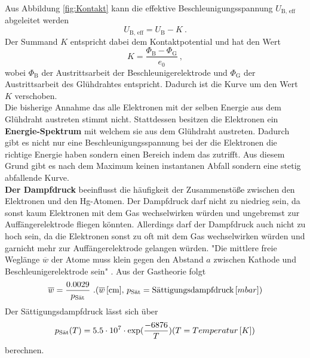 Aus Abbildung \eqref{fig:Kontakt} kann die effektive Beschleunigungsspannung $U_\text{B, eff}$ abgeleitet werden
\begin{equation*}
	U_\text{B, eff} = U_\text{B} - K \ .
\end{equation*}
Der Summand $K$ entspricht dabei dem Kontaktpotential und hat den Wert
\begin{equation*}
	K = \frac{\Phi_\text{B} - \Phi_\text{G}}{e_0} \ ,
\end{equation*}
wobei $\Phi_\text{B}$ der Austrittsarbeit der Beschleunigerelektrode und $\Phi_\text{G}$ der Austrittsarbeit des Glühdrahtes entspricht. Dadurch ist die Kurve um den Wert $K$ verschoben. \\
Die bisherige Annahme das alle Elektronen mit der selben Energie aus dem Glühdraht austreten stimmt nicht. Stattdessen besitzen die Elektronen ein \textbf{Energie-Spektrum} mit welchem sie aus dem Glühdraht austreten. Dadurch gibt es nicht nur eine Beschleunigungsspannung bei der die Elektronen die richtige Energie haben sondern einen Bereich indem das zutrifft. Aus diesem Grund gibt es nach dem Maximum keinen instantanen Abfall sondern eine stetig abfallende Kurve. \\
\textbf{Der Dampfdruck} beeinflusst die häufigkeit der Zusammenstöße zwischen den Elektronen und den Hg-Atomen. Der Dampfdruck darf nicht zu niedrieg sein, da sonst kaum Elektronen mit dem Gas wechselwirken würden und ungebremst zur Auffängerelektrode fliegen könnten. Allerdings darf der Dampfdruck auch nicht zu hoch sein, da die Elektronen sonst zu oft mit dem Gas wechselwirken würden und garnicht mehr zur Auffängerelektrode gelangen würden. "Die mittlere freie Weglänge $\overline{w}$ der Atome muss klein gegen den Abstand $a$ zwischen Kathode und Beschleunigerelektrode sein" \cite[6]{sample}. Aus der Gastheorie folgt
\begin{equation*}
	\overline{w} = \frac{0.0029}{p_\text{Sät}} \ . \\
	(\overline{w}\, [\text{cm}],\, p_\text{Sät} = \text{Sättigungsdampfdruck}\, [mbar])
\end{equation*}
Der Sättigungsdampfdruck lässt sich über
\begin{equation*}
	p_\text{Sät}(T) = 5.5 \cdot 10^7 \cdot \exp(\frac{-6876}{T}) \\
	(T = Temperatur\, [K])
\end{equation*}
berechnen.

























